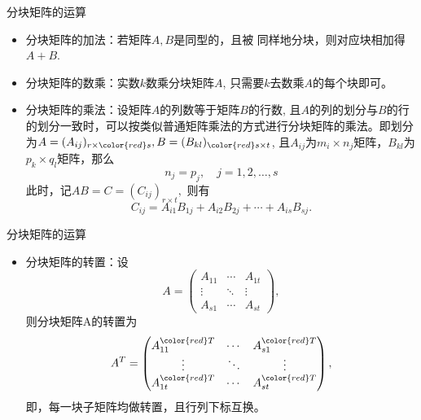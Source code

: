 \begin{frame}

\begin{block}{分块矩阵的运算}
\begin{itemize}
\item 分块矩阵的加法：若矩阵$A,B$是同型的，且被{\color{red} 同样地分块}，则{\color{red}对应块相加}得$A+B$.
\item 分块矩阵的数乘：实数$k$数乘分块矩阵$A$, 只需要$k$去数乘$A$的每个块即可。
\item 分块矩阵的乘法：设矩阵$A$的列数等于矩阵$B$的行数, 且$A$的列的划分与$B$的行的划分一致时，可以按类似普通矩阵乘法的方式进行分块矩阵的乘法。即划分为$A = (A_{ij})_{r\times {\color{red}s}}, B = (B_{kl})_{{\color{red}s}\times t}$, 且$A_{ij}$为$m_i\times n_j$矩阵，$B_{kl}$为$p_k\times q_l$矩阵，那么
\[n_j = p_j, \quad j = 1, 2, \ldots, s\]
此时，记$AB = C = (C_{ij})_{r\times t},$ 则有
\[C_{ij} = A_{i1}B_{1j} + A_{i2}B_{2j} + \cdots + A_{is}B_{sj}.\]
\end{itemize}
\end{block}

\end{frame}


\begin{frame}

\begin{block}{分块矩阵的运算}
\begin{itemize}
\item 分块矩阵的转置：设
\[A = \begin{pmatrix}
A_{11} & \cdots & A_{1t} \\
\vdots & \ddots & \vdots \\
A_{s1} & \cdots & A_{st}
\end{pmatrix},\]
则分块矩阵A的转置为
\[A^T = \begin{pmatrix}
A_{11}^{{\color{red}T}} & \cdots & A_{s1}^{{\color{red}T}} \\
\vdots & \ddots & \vdots \\
A_{1t}^{{\color{red}T}} & \cdots & A_{st}^{{\color{red}T}}
\end{pmatrix},\]
即，每一块子矩阵均做转置，且行列下标互换。
\end{itemize}
\end{block}

\end{frame}


